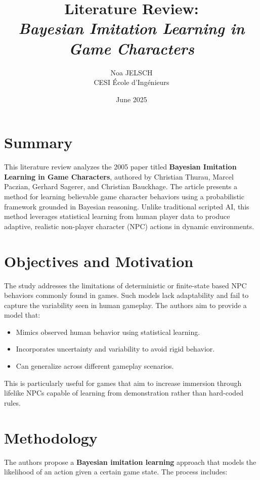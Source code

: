 \documentclass[12pt,a4paper]{article}
\title{Literature Review:\\\textit{Bayesian Imitation Learning in Game Characters}}
\author{Noa JELSCH\\CESI École d'Ingénieurs}
\date{June 2025}
\begin{document}
\maketitle

\section*{Summary}

This literature review analyzes the 2005 paper titled \textbf{Bayesian Imitation Learning in Game Characters}, authored by Christian Thurau, Marcel Paczian, Gerhard Sagerer, and Christian Bauckhage. The article presents a method for learning believable game character behaviors using a probabilistic framework grounded in Bayesian reasoning. Unlike traditional scripted AI, this method leverages statistical learning from human player data to produce adaptive, realistic non-player character (NPC) actions in dynamic environments.

\section*{Objectives and Motivation}

The study addresses the limitations of deterministic or finite-state based NPC behaviors commonly found in games. Such models lack adaptability and fail to capture the variability seen in human gameplay. The authors aim to provide a model that:
\begin{itemize}
  \item Mimics observed human behavior using statistical learning.
  \item Incorporates uncertainty and variability to avoid rigid behavior.
  \item Can generalize across different gameplay scenarios.
\end{itemize}

This is particularly useful for games that aim to increase immersion through lifelike NPCs capable of learning from demonstration rather than hard-coded rules.

\section*{Methodology}

The authors propose a \textbf{Bayesian imitation learning} approach that models the likelihood of an action given a certain game state. The process includes:
\end{document}
